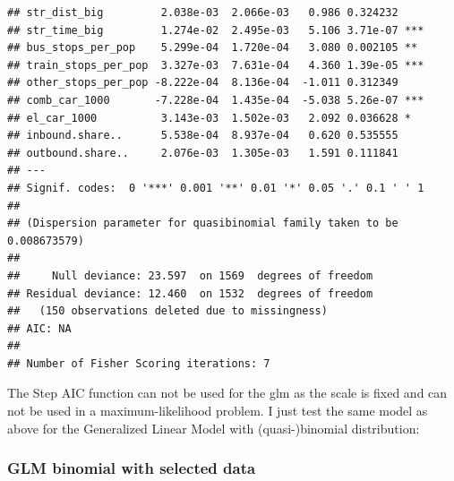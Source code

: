 \documentclass[
]{article}
\begin{document}
\begin{verbatim}
## str_dist_big         2.038e-03  2.066e-03   0.986 0.324232    
## str_time_big         1.274e-02  2.495e-03   5.106 3.71e-07 ***
## bus_stops_per_pop    5.299e-04  1.720e-04   3.080 0.002105 ** 
## train_stops_per_pop  3.327e-03  7.631e-04   4.360 1.39e-05 ***
## other_stops_per_pop -8.222e-04  8.136e-04  -1.011 0.312349    
## comb_car_1000       -7.228e-04  1.435e-04  -5.038 5.26e-07 ***
## el_car_1000          3.143e-03  1.502e-03   2.092 0.036628 *  
## inbound.share..      5.538e-04  8.937e-04   0.620 0.535555    
## outbound.share..     2.076e-03  1.305e-03   1.591 0.111841    
## ---
## Signif. codes:  0 '***' 0.001 '**' 0.01 '*' 0.05 '.' 0.1 ' ' 1
## 
## (Dispersion parameter for quasibinomial family taken to be 0.008673579)
## 
##     Null deviance: 23.597  on 1569  degrees of freedom
## Residual deviance: 12.460  on 1532  degrees of freedom
##   (150 observations deleted due to missingness)
## AIC: NA
## 
## Number of Fisher Scoring iterations: 7
\end{verbatim}

The Step AIC function can not be used for the glm as the scale is fixed
and can not be used in a maximum-likelihood problem. I just test the
same model as above for the Generalized Linear Model with
(quasi-)binomial distribution:

\hypertarget{glm-binomial-with-selected-data}{%
\subsubsection{GLM binomial with selected
data}\label{glm-binomial-with-selected-data}}
\end{document}

